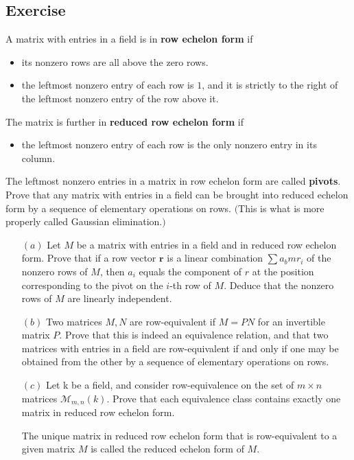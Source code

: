 \subsection{Exercise}
\begin{exercise}
A matrix with entries in a field is in \textbf{row echelon form} if
\begin{itemize}
\item its nonzero rows are all above the zero rows.
\item the leftmost nonzero entry of each row is $1$, and it is strictly to the right of the leftmost nonzero entry of the row above it.
\end{itemize}
The matrix is further in \textbf{reduced row echelon form} if
\begin{itemize}
\item the leftmost nonzero entry of each row is the only nonzero entry in its column.
\end{itemize}
The leftmost nonzero entries in a matrix in row echelon form are called \textbf{pivots}.
Prove that any matrix with entries in a field can be brought into reduced echelon form by a sequence of elementary operations on rows. $($This is what is more properly called Gaussian elimination.$)$
\end{exercise}
\begin{exercise}
\mbox{}
\begin{itemize}
\item[$(a)$]Let $M$ be a matrix with entries in a field and in reduced row echelon form. Prove that if a row vector $\bm{r}$ is a linear combination $\sum a_bm{r}_i$ of the nonzero rows of $M$, then $a_i$ equals the component of $r$ at the position corresponding to the pivot on the $i$-th row of $M$. Deduce that the nonzero rows of $M$ are linearly independent.
\item[$(b)$]Two matrices $M,N$ are row-equivalent if $M=PN$ for an invertible matrix $P$. Prove that this is indeed an equivalence relation, and that two matrices with entries in a field are row-equivalent if and only if one may be obtained from the other by a sequence of elementary operations on rows.
\item[$(c)$]Let k be a field, and consider row-equivalence on the set of $m\times n$ matrices $\mathcal{M}_{m,n}(k)$. Prove that each equivalence class contains exactly one matrix in reduced row echelon form.\par
The unique matrix in reduced row echelon form that is row-equivalent to a given matrix $M$ is called the reduced echelon form of $M$.
\end{itemize}
\end{exercise}
